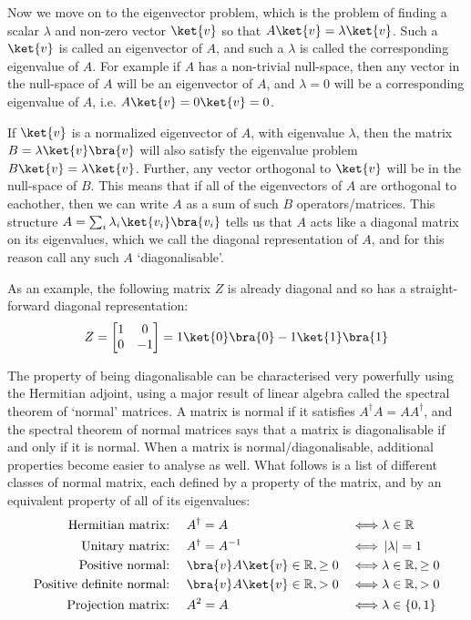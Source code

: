 Now we move on to the eigenvector problem, which is the problem of finding a scalar $\lambda$ and non-zero vector $\ket{v}$ so that $A\ket{v}=\lambda\ket{v}$. Such a $\ket{v}$ is called an eigenvector of $A$, and such a $\lambda$ is called the corresponding eigenvalue of $A$. For example if $A$ has a non-trivial null-space, then any vector in the null-space of $A$ will be an eigenvector of $A$, and $\lambda=0$ will be a corresponding eigenvalue of $A$, i.e. $A\ket{v} = 0\ket{v} = 0$.

If $\ket{v}$ is a normalized eigenvector of $A$, with eigenvalue $\lambda$, then the matrix $B=\lambda\ket{v}\bra{v}$ will also satisfy the eigenvalue problem $B\ket{v}=\lambda\ket{v}$. Further, any vector orthogonal to $\ket{v}$ will be in the null-space of $B$. This means that if all of the eigenvectors of $A$ are orthogonal to eachother, then we can write $A$ as a sum of such $B$ operators/matrices. This structure $A = \sum_i \lambda_i \ket{v_i}\bra{v_i}$ tells us that $A$ acts like a diagonal matrix on its eigenvalues, which we call the diagonal representation of $A$, and for this reason call any such $A$ `diagonalisable'.

As an example, the following matrix $Z$ is already diagonal and so has a straight-forward diagonal representation:
\begin{align*}
	Z = \left[\begin{matrix}
		1&0\\
		0&-1
	\end{matrix}\right] = 1\ket{0}\bra{0} - 1\ket{1}\bra{1}
\end{align*}

The property of being diagonalisable can be characterised very powerfully using the Hermitian adjoint, using a major result of linear algebra called the spectral theorem of `normal' matrices. A matrix is normal if it satisfies $A^\dagger A = AA^\dagger$, and the spectral theorem of normal matrices says that a matrix is diagonalisable if and only if it is normal. When a matrix is normal/diagonalisable, additional properties become easier to analyse as well. What follows is a list of different classes of normal matrix, each defined by a property of the matrix, and by an equivalent property of all of its eigenvalues:
\begin{align*}
	\text{Hermitian matrix:\ }&&& A^\dagger = A & \iff& \lambda \in \mathbb{R} \\
	\text{Unitary matrix:\ }&&& A^\dagger = A^{-1} & \iff& \ord{\lambda}=1 \\
	\text{Positive normal:\ }&&& \bra{v}A\ket{v} \in \mathbb{R}, \geq 0 & \iff& \lambda \in \mathbb{R}, \geq 0 \\
	\text{Positive definite normal:\ }&&& \bra{v}A\ket{v} \in \mathbb{R}, > 0 & \iff& \lambda \in \mathbb{R}, > 0 \\
	\text{Projection matrix:\ }&&& A^2 = A & \iff& \lambda \in \{0, 1\} \\
\end{align*}


